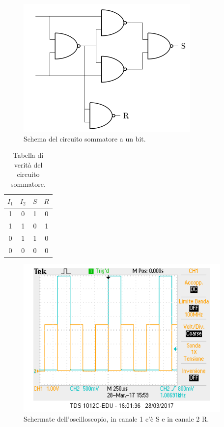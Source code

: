 \documentclass[10pt,a4paper]{article}
\begin{document}
\begin{figure}[!htb]
  \centering
  \includegraphics[scale=0.5]{sommatore.png}
\caption{Schema del circuito sommatore a un bit.\label{fig:sommatore}}
\end{figure}

\begin{table}[!htb]
\centering
\begin{tabular}{|c|c|c|c|}
\hline 
$I_1$ & $I_2$ & $S$ & $R$\\
\hline
 1 &  0 & 1 & 0\\ 
 
 1 &  1 & 0 & 1\\ 

 0 &  1 & 1 & 0\\ 
 
 0 &  0 & 0 & 0\\ 
\hline 
\end{tabular} 
\caption{Tabella di verità del circuito sommatore.\label{tab:sommatore}}
\end{table}

\begin{figure}[!htb]
  \centering
  \includegraphics[scale=0.75]{sommatoreRS.png}
\caption{Schermate dell'oscilloscopio, in canale 1 c'è S e in canale 2 R.\label{osc:sommatore}}
\end{figure}
\end{document}
